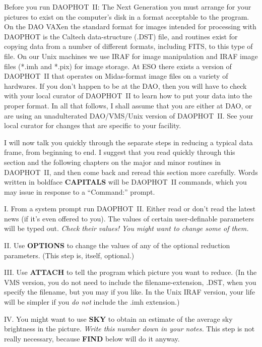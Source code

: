 Before you run DAOPHOT~II: The Next Generation you must arrange for
your pictures to exist on the computer's disk in a format acceptable to
the program.  On the DAO VAXen the standard format for images intended
for processing with DAOPHOT is the Caltech data-structure (.DST) file,
and routines exist for copying data from a number of different formats,
including FITS, to this type of file. On our Unix machines we use IRAF
for image manipulation and IRAF image files (*.imh and *.pix) for image
storage. At ESO there exists a version of DAOPHOT~II that operates on
Midas-format image files on a variety of hardwares. If you don't happen
to be at the DAO, then you will have to check with your local curator
of DAOPHOT~II to learn how to put your data into the proper format. In
all that follows, I shall assume that you are either at DAO, or are
using an unadulterated DAO/VMS/Unix version of DAOPHOT~II.  See your
local curator for changes that are specific to your facility.

I will now talk you quickly through the separate steps in reducing
a typical data frame, from beginning to end.  I suggest that you read
quickly through this section and the following chapters on the major
and minor routines in DAOPHOT~II, and then come back and reread this
section more carefully.  Words written in boldface {\bf CAPITALS} will
be DAOPHOT~II commands, which you may issue in response to a
``Command:'' prompt. 

\item{I.} From a system prompt run DAOPHOT~II. Either read or don't
read the latest news (if it's even offered to you).  The values of
certain user-definable parameters will be typed out.  {\it Check their
values!  You might want to change some of them.}

\item{II.} Use {\bf OPTIONS} to change the values of any of the
optional reduction parameters. (This step is, itself, optional.)

\item{III.} Use {\bf ATTACH}  to tell the program which picture you
want to reduce. (In the VMS version, you do not need to include the
filename-extension, .DST, when you specify the filename, but you may if
you like.  In the Unix IRAF version, your life will be simpler if you
{\it do not\/} include the .imh extension.)

\item{IV.} You might want to use {\bf SKY} to obtain an estimate of the
average sky brightness in the picture.  {\it Write this number down in
your notes.\/}  This step is not really necessary, because {\bf FIND}
below will do it anyway.

